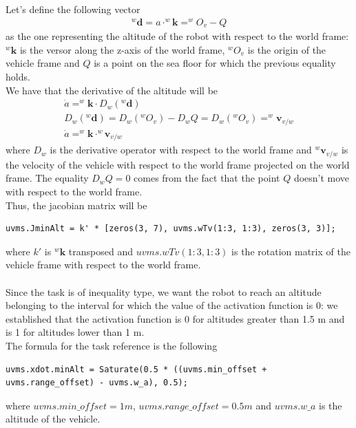 \documentclass{article}
\begin{document}
Let's define the following vector
\begin{gather*}
	^{w}\boldsymbol{d} = a \cdot ^{w}\boldsymbol{k} = ^{w}O_{v} - Q
\end{gather*}
as the one representing the altitude of the robot with respect to the world frame:$ ^{w}\boldsymbol{k} $ is the versor along the z-axis of the world frame, $ ^{w}O_{v} $ is the origin of the vehicle frame and $ Q $ is a point on the sea floor for which the previous equality holds. \\

We have that the derivative of the altitude will be
\begin{gather*}
	\dot{a} = ^{w}\boldsymbol{k} \cdot D_{w}(^{w}\boldsymbol{d}) \\
	D_{w}(^{w}\boldsymbol{d}) = D_{w}(^{w}O_{v}) - D_{w}Q = D_{w}(^{w}O_{v}) = ^{w}\boldsymbol{v}_{v/w} \\
	\dot{a} = ^{w}\boldsymbol{k} \cdot ^{w}\boldsymbol{v}_{v/w}
\end{gather*}
where $ D_{w} $ is the derivative operator with respect to the world frame and $ ^{w}\boldsymbol{v}_{v/w} $ is the velocity of the vehicle with respect to the world frame projected on the world frame. The equality $ D_{w}Q = 0 $ comes from the fact that the point $ Q $ doesn't move with respect to the world frame. \\

Thus, the jacobian matrix will be
\begin{lstlisting}
uvms.JminAlt = k' * [zeros(3, 7), uvms.wTv(1:3, 1:3), zeros(3, 3)];
\end{lstlisting}
where $ k' $ is $ ^{w}\boldsymbol{k} $ transposed and $ uvms.wTv(1:3, 1:3) $ is the rotation matrix of the vehicle frame with respect to the world frame. \\ \\

Since the task is of inequality type, we want the robot to reach an altitude belonging to the interval for which the value of the activation function is 0: we established that the activation function is 0 for altitudes greater than 1.5 m and is 1 for altitudes lower than 1 m. \\

The formula for the task reference is the following
\begin{lstlisting}
uvms.xdot.minAlt = Saturate(0.5 * ((uvms.min_offset + uvms.range_offset) - uvms.w_a), 0.5);
\end{lstlisting}
where $ uvms.min\_offset = 1 m $, $ uvms.range\_offset = 0.5 m $ and $ uvms.w\_a $ is the altitude of the vehicle.
\end{document}
